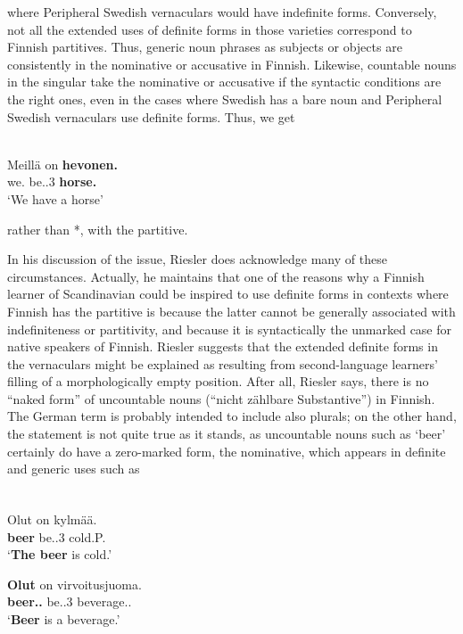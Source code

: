 \z

where Peripheral Swedish vernaculars would have indefinite forms. Conversely, not all the extended uses of definite forms in those varieties correspond to Finnish partitives. Thus, generic noun phrases as subjects or objects are consistently in the nominative or accusative in Finnish. Likewise, countable nouns in the singular take the nominative or accusative if the syntactic conditions are the right ones, even in the cases where Swedish has a bare noun and Peripheral Swedish vernaculars use definite forms. Thus, we get

\ea \label{} 
\\
\gll Meillä  on  \textbf{hevonen.} \\
we.{\all}  be.{\prs}.3{\sg}  \textbf{horse.{\nom}} \\
\glt ‘We have a horse’

\z

rather than *, with the partitive.

In his discussion of the issue, Riesler does acknowledge many of these circumstances. Actually, he maintains that one of the reasons why a Finnish learner of Scandinavian could be inspired to use definite forms in contexts where Finnish has the partitive is because the latter cannot be generally associated with indefiniteness or partitivity, and because it is syntactically the unmarked case for native speakers of Finnish. Riesler suggests that the extended definite forms in the vernaculars might be explained as resulting from second-language learners’ filling of a morphologically empty position. After all, Riesler says, there is no “naked form” of uncountable nouns (“nicht zählbare Substantive”) in Finnish. The German term is probably intended to include also plurals; on the other hand, the statement is not quite true as it stands, as uncountable nouns such as  ‘beer’ certainly do have a zero-marked form, the nominative, which appears in definite and generic uses such as

\ea\label{}
\\
\gll Olut  on\textsuperscript{  }kylmää.\\
\textbf{beer} be.{\prs}.3{\sg}  cold.P{\art}.{\sg}\\
\glt ‘\textbf{The beer} is cold.’

\z

\ea
\gll \textbf{Olut} on  virvoitusjuoma.\\
\textbf{beer.{\nom}.{\sg}} be.{\prs}.3{\sg}  beverage.{\nom}.{\sg}\\
\glt ‘\textbf{Beer} is a beverage.’

